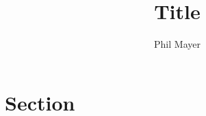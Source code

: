 \documentclass[11pt]{amsart}
\title{Title}
\author{Phil Mayer}
\theoremstyle{definition}
\begin{document}
\maketitle

\section{Section}
\end{document}
